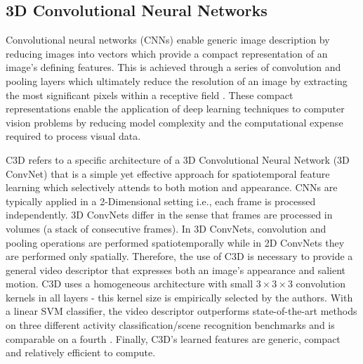 \documentclass[sigplan,authorversion,nonacm, 9pt]{acmart}
\begin{document}
\subsection{3D Convolutional Neural Networks} \label{subsec:C3D}
Convolutional neural networks (CNNs) enable generic image description by reducing images into vectors which provide a compact representation of an image's defining features. This is achieved through a series of convolution and pooling layers which ultimately reduce the resolution of an image by extracting the most significant pixels within a receptive field \cite{dutran}. These compact representations enable the application of deep learning techniques to computer vision problems by reducing model complexity and the computational expense required to process visual data. 
\par
C3D \cite{dutran} refers to a specific architecture of a 3D Convolutional Neural Network (3D ConvNet) that is a simple yet effective approach for spatiotemporal feature learning which selectively attends to both motion and appearance. 
CNNs are typically applied in a 2-Dimensional setting i.e., each frame is processed independently. 3D ConvNets differ in the sense that frames are processed in volumes (a stack of consecutive frames). In 3D ConvNets, convolution and pooling operations are performed spatiotemporally while in 2D ConvNets they are performed only spatially. Therefore, the use of C3D is necessary to provide a general video descriptor that expresses both an image's appearance and salient motion.
C3D uses a homogeneous architecture with small $3 \times 3 \times 3$ convolution kernels in all layers - this kernel size is empirically selected by the authors. With a linear SVM classifier, the video descriptor outperforms state-of-the-art methods \cite{idt} \cite{imagenet} on three different activity classification/scene recognition benchmarks \cite{ucf101} \cite{yupenn} \cite{maryland} and is comparable on a fourth \cite{sports1m}. Finally, C3D's learned features are generic, compact and relatively efficient to compute. 
\end{document}
